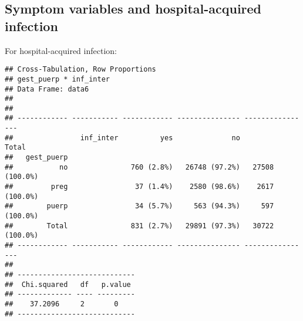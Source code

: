 \documentclass[
]{article}
\newenvironment{Shaded}{\begin{snugshade}}{\end{snugshade}}
\newcommand{\DataTypeTok}[1]{\textcolor[rgb]{0.13,0.29,0.53}{#1}}
\newcommand{\KeywordTok}[1]{\textcolor[rgb]{0.13,0.29,0.53}{\textbf{#1}}}
\newcommand{\NormalTok}[1]{#1}
\newcommand{\OperatorTok}[1]{\textcolor[rgb]{0.81,0.36,0.00}{\textbf{#1}}}
\newcommand{\OtherTok}[1]{\textcolor[rgb]{0.56,0.35,0.01}{#1}}
\newcommand{\StringTok}[1]{\textcolor[rgb]{0.31,0.60,0.02}{#1}}
\begin{document}
\hypertarget{symptom-variables-and-hospital-acquired-infection}{%
\subsection{Symptom variables and hospital-acquired
infection}\label{symptom-variables-and-hospital-acquired-infection}}

For hospital-acquired infection:

\begin{Shaded}
\end{Shaded}

\begin{verbatim}
## Cross-Tabulation, Row Proportions  
## gest_puerp * inf_inter  
## Data Frame: data6  
## 
## 
## ------------ ----------- ------------ --------------- ----------------
##                inf_inter          yes              no            Total
##   gest_puerp                                                          
##           no               760 (2.8%)   26748 (97.2%)   27508 (100.0%)
##         preg                37 (1.4%)    2580 (98.6%)    2617 (100.0%)
##        puerp                34 (5.7%)     563 (94.3%)     597 (100.0%)
##        Total               831 (2.7%)   29891 (97.3%)   30722 (100.0%)
## ------------ ----------- ------------ --------------- ----------------
## 
## ----------------------------
##  Chi.squared   df   p.value 
## ------------- ---- ---------
##    37.2096     2       0    
## ----------------------------
\end{verbatim}

\begin{Shaded}
\end{Shaded}
\end{document}
